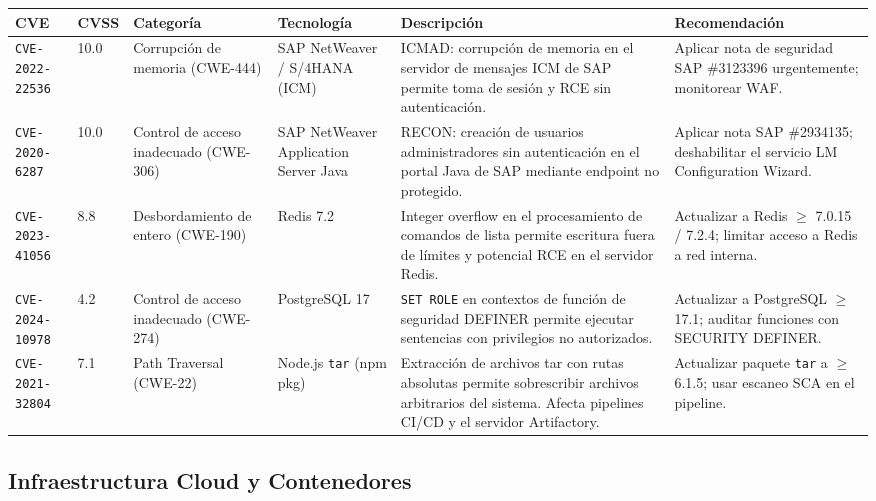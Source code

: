 \documentclass[letterpaper,11pt]{article}
\begin{document}
\begingroup\footnotesize
{}
\begin{tabular}{|p{2.3cm}|p{0.65cm}|p{1.9cm}|p{2.0cm}|p{3.9cm}|p{3.0cm}|}
\hline
\rowcolor{orange!22}
\textbf{CVE} & \textbf{CVSS} & \textbf{Categoría} & \textbf{Tecnología} & \textbf{Descripción} & \textbf{Recomendación} \\
\hline
\texttt{CVE-2022-22536} & 10.0 & Corrupción de memoria (CWE-444) & SAP NetWeaver / S/4HANA (ICM) & ICMAD: corrupción de memoria en el servidor de mensajes ICM de SAP permite toma de sesión y RCE sin autenticación. & Aplicar nota de seguridad SAP \#3123396 urgentemente; monitorear WAF. \\
\hline
\texttt{CVE-2020-6287} & 10.0 & Control de acceso inadecuado (CWE-306) & SAP NetWeaver Application Server Java & RECON: creación de usuarios administradores sin autenticación en el portal Java de SAP mediante endpoint no protegido. & Aplicar nota SAP \#2934135; deshabilitar el servicio LM Configuration Wizard. \\
\hline
\texttt{CVE-2023-41056} & 8.8 & Desbordamiento de entero (CWE-190) & Redis 7.2 & Integer overflow en el procesamiento de comandos de lista permite escritura fuera de límites y potencial RCE en el servidor Redis. & Actualizar a Redis $\geq$ 7.0.15 / 7.2.4; limitar acceso a Redis a red interna. \\
\hline
\texttt{CVE-2024-10978} & 4.2 & Control de acceso inadecuado (CWE-274) & PostgreSQL 17 & \texttt{SET ROLE} en contextos de función de seguridad DEFINER permite ejecutar sentencias con privilegios no autorizados. & Actualizar a PostgreSQL $\geq$ 17.1; auditar funciones con SECURITY DEFINER. \\
\hline
\texttt{CVE-2021-32804} & 7.1 & Path Traversal (CWE-22) & Node.js \texttt{tar} (npm pkg) & Extracción de archivos tar con rutas absolutas permite sobrescribir archivos arbitrarios del sistema. Afecta pipelines CI/CD y el servidor Artifactory. & Actualizar paquete \texttt{tar} a $\geq$ 6.1.5; usar escaneo SCA en el pipeline. \\
\hline
\end{tabular}
\endgroup

\subsection{Infraestructura Cloud y Contenedores}
\end{document}
